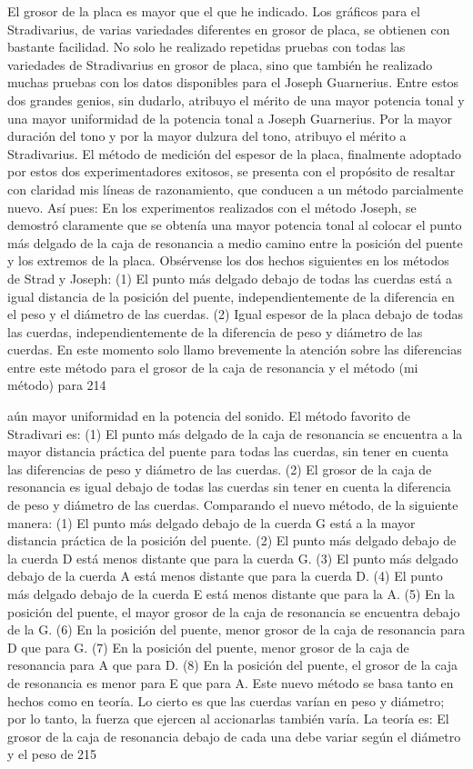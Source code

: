 El grosor de la placa es mayor que el que he indicado. Los gráficos para el Stradivarius, de varias variedades diferentes en grosor de placa, se obtienen con bastante facilidad. No solo he realizado repetidas pruebas con todas las variedades de Stradivarius en grosor de placa, sino que también he realizado muchas pruebas con los datos disponibles para el Joseph Guarnerius. Entre estos dos grandes genios, sin dudarlo, atribuyo el mérito de una mayor potencia tonal y una mayor uniformidad de la potencia tonal a Joseph Guarnerius. Por la mayor duración del tono y por la mayor dulzura del tono, atribuyo el mérito a Stradivarius.
El método de medición del espesor de la placa, finalmente adoptado por estos dos experimentadores exitosos, se presenta con el propósito de resaltar con claridad mis líneas de razonamiento, que conducen a un método parcialmente nuevo.
Así pues: En los experimentos realizados con el método Joseph, se demostró claramente que se obtenía una mayor potencia tonal al colocar el punto más delgado de la caja de resonancia a medio camino entre la posición del puente y los extremos de la placa.
Obsérvense los dos hechos siguientes en los métodos de Strad y Joseph:
(1) El punto más delgado debajo de todas las cuerdas está a igual distancia de la posición del puente, independientemente de la diferencia en el peso y el diámetro de las cuerdas.
(2) Igual espesor de la placa debajo de todas las cuerdas, independientemente de la diferencia de peso y diámetro de las cuerdas.
En este momento solo llamo brevemente la atención sobre las diferencias entre este método para el grosor de la caja de resonancia y el método (mi método) para
214

aún mayor uniformidad en la potencia del sonido. El método favorito de Stradivari es:
(1) El punto más delgado de la caja de resonancia se encuentra a la mayor distancia práctica del puente para todas las cuerdas, sin tener en cuenta las diferencias de peso y diámetro de las cuerdas.
(2) El grosor de la caja de resonancia es igual debajo de todas las cuerdas sin tener en cuenta la diferencia de peso y diámetro de las cuerdas.
Comparando el nuevo método, de la siguiente manera:
(1) El punto más delgado debajo de la cuerda G está a la mayor distancia práctica de la posición del puente.
(2) El punto más delgado debajo de la cuerda D está menos distante que para la cuerda G.
(3) El punto más delgado debajo de la cuerda A está menos distante que para la cuerda D.
(4) El punto más delgado debajo de la cuerda E está menos distante que para la A.
(5) En la posición del puente, el mayor grosor de la caja de resonancia se encuentra debajo de la G.
(6) En la posición del puente, menor grosor de la caja de resonancia para D que para G.
(7) En la posición del puente, menor grosor de la caja de resonancia para A que para D.
(8) En la posición del puente, el grosor de la caja de resonancia es menor para E que para A.
Este nuevo método se basa tanto en hechos como en
teoría.
Lo cierto es que las cuerdas varían en peso y diámetro; por lo tanto, la fuerza que ejercen al accionarlas también varía.
La teoría es: El grosor de la caja de resonancia debajo de cada una debe variar según el diámetro y el peso de
215

